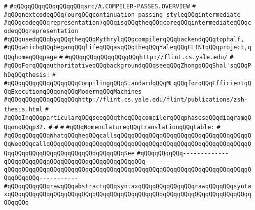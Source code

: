 \verb|#|\newline
\verb|#qQQqqQQqqQQqqQQqqQQqsrc/A.COMPILER-PASSES.OVERVIEW|\newline
\verb|#|\newline
\verb|#qQQqnextcodeqQQq(ourqQQqcontinuation-passing-styleqQQqintermediate|\newline
\verb|#qQQqcodeqQQqrepresentation)qQQqisqQQqtheqQQqcoreqQQqintermediateqQQqcodeqQQqrepresentation|\newline
\verb|#qQQqusedqQQqbyqQQqtheqQQqMythrylqQQqcompilerqQQqbackendqQQqtophalf,|\newline
\verb|#qQQqwhichqQQqbeganqQQqlifeqQQqasqQQqtheqQQqYaleqQQqFLINTqQQqproject,qQQqhomeqQQqpage|\newline
\verb|#|\newline
\verb|#qQQqqQQqqQQqqQQqqQQqhttp://flint.cs.yale.edu/|\newline
\verb|#|\newline
\verb|#qQQqForqQQqauthoritativeqQQqbackgroundqQQqseeqQQqZhongqQQqShal'sqQQqPhDqQQqthesis:|\newline
\verb|#|\newline
\verb|#qQQqqQQqqQQqqQQqqQQqCompilingqQQqStandardqQQqMLqQQqforqQQqEfficientqQQqExecutionqQQqonqQQqModernqQQqMachines|\newline
\verb|#qQQqqQQqqQQqqQQqqQQqhttp://flint.cs.yale.edu/flint/publications/zsh-thesis.html|\newline
\verb|#|\newline
\verb|#qQQqInqQQqparticularqQQqseeqQQqtheqQQqcompilerqQQqphasesqQQqdiagramqQQqonqQQqp32.|\newline
\verb|#|\newline
\verb|#|\newline
\verb|#|\newline
\verb|#qQQqNomenclatureqQQqtranslationqQQqtable:|\newline
\verb|#|\newline
\verb|#qQQqqQQqqQQqWhatqQQqheqQQqcallsqQQqqQQqqQQqqQQqqQQqqQQqqQQqqQQqqQQqqQQqWeqQQqcallqQQqqQQqqQQqqQQqqQQqqQQqqQQqqQQqqQQqqQQqqQQqqQQqqQQqqQQqqQQqqQQqqQQqqQQqqQQqqQQqqQQqqQQqqQQqSee|\newline
\verb|#qQQqqQQqqQQq-------------qQQqqQQqqQQqqQQqqQQqqQQqqQQqqQQqqQQqqQQq----------qQQqqQQqqQQqqQQqqQQqqQQqqQQqqQQqqQQqqQQqqQQqqQQqqQQqqQQqqQQqqQQqqQQqqQQqqQQqqQQq-----------|\newline
\verb|#qQQqqQQqqQQqrawqQQqabstractqQQqsyntaxqQQqqQQqqQQqqQQqrawqQQqqQQqsyntaxqQQqqQQqqQQqqQQqqQQqqQQqqQQqqQQqqQQqqQQqqQQqqQQqqQQqqQQqqQQqqQQqqQQqqQQqqQQq|\newline
